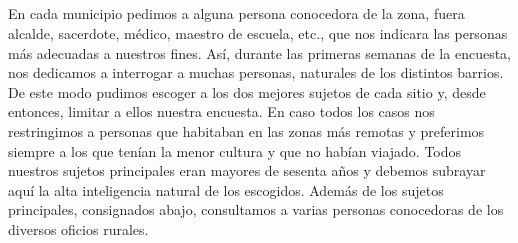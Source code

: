 \documentclass[11pt,spanish,b5paper]{book}
\begin{document}
\subsection{} En cada municipio pedimos a alguna persona conocedora de la zona, fuera alcalde, sacerdote, médico, maestro de escuela, etc., que nos indicara las personas más adecuadas a nuestros fines. Así, durante las primeras semanas de la encuesta, nos dedicamos a interrogar a muchas personas, naturales de los distintos barrios. De este modo pudimos escoger a los dos mejores sujetos de cada sitio y, desde entonces, limitar a ellos nuestra encuesta. En caso todos los casos nos restringimos a personas que habitaban en las zonas más remotas y preferimos siempre a los que tenían la menor cultura y que no habían viajado. Todos nuestros sujetos principales eran mayores de sesenta años y debemos subrayar aquí la alta inteligencia natural de los escogidos. Además de los sujetos principales, consignados abajo, consultamos a varias personas conocedoras de los diversos oficios rurales. 
\end{document}
